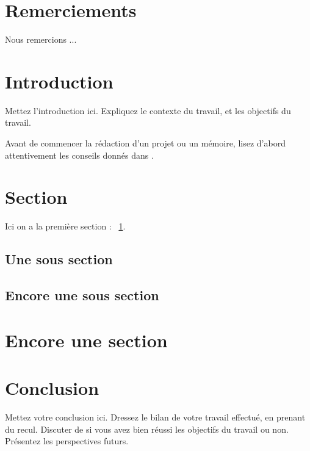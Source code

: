 \documentclass[12pt,a4paper, titlepage]{article}
\begin{document}
\newpage
% 
\section*{Remerciements}

Nous remercions ...\\

\newpage
\thispagestyle{fancy}
\tableofcontents


\newpage
\section*{Introduction}
Mettez l'introduction ici. Expliquez le contexte du travail, et les objectifs du travail.

Avant de commencer la r\'edaction d'un projet ou un mémoire, lisez d'abord attentivement les conseils donn\'es dans \cite{Melot2007UMONS}.

\newpage

\section{Section}%
\label{sec:1}

Ici on a la premi\`ere section : ~\ref{sec:1}.

\subsection{Une sous section}

\subsection{Encore une sous section}

\section{Encore une section}


\section*{Conclusion}

Mettez votre conclusion ici.  Dressez le bilan de votre travail effectué, en prenant du recul. Discuter de si vous avez bien réussi les objectifs du travail ou non. Présentez les perspectives futurs.





\end{document}
